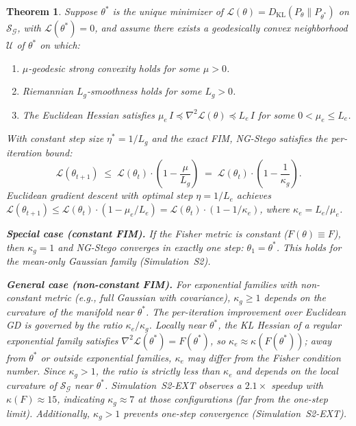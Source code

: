 \documentclass[a4paper,fleqn]{cas-dc}
\newtheorem{theorem}{Theorem}
\newcommand{\calS}{\mathcal{S}}
\newcommand{\calG}{\mathcal{G}}
\newcommand{\DKL}{D_{\mathrm{KL}}}
\begin{document}
\begin{theorem}%
  \label{thm:ng_convergence}
  Suppose $\theta^*$ is the unique minimizer of
  $\mathcal{L}(\theta)=\DKL(P_\theta\|P_{\theta^*})$ on $\calS_{\calG}$,
  with $\mathcal{L}(\theta^*)=0$, and assume there exists a geodesically
  convex neighborhood $\mathcal{U}$ of $\theta^*$ on which:
  \begin{enumerate}
    \item[(i)] \emph{$\mu$-geodesic strong convexity} holds
          for some $\mu>0$.
    \item[(ii)] \emph{Riemannian $L_g$-smoothness} holds for some $L_g>0$.
    \item[(iii)] The Euclidean Hessian satisfies
          $\mu_e\,I \preceq \nabla^2\mathcal{L}(\theta) \preceq L_e\,I$
          for some $0<\mu_e\leq L_e$.
  \end{enumerate}
  With constant step size $\eta^* = 1/L_g$ and the exact FIM, NG-Stego
  satisfies the per-iteration bound:
  \begin{equation}
    \mathcal{L}(\theta_{t+1})
    \;\leq\; \mathcal{L}(\theta_t)\cdot\left(1 - \frac{\mu}{L_g}\right)
    \;=\; \mathcal{L}(\theta_t)\cdot\left(1 - \frac{1}{\kappa_g}\right).
    \label{eq:ng_rate}
  \end{equation}
  Euclidean gradient descent with optimal step $\eta = 1/L_e$ achieves
  $\mathcal{L}(\theta_{t+1}) \leq \mathcal{L}(\theta_t)\cdot(1 - \mu_e/L_e)
  = \mathcal{L}(\theta_t)\cdot(1 - 1/\kappa_e)$, where
  $\kappa_e = L_e/\mu_e$.

  \textbf{Special case (constant FIM).}
  If the Fisher metric is constant ($F(\theta) \equiv F$), then
  $\kappa_g = 1$ and NG-Stego converges in \emph{exactly one step}:
  $\theta_1 = \theta^*$.
  This holds for the mean-only Gaussian family
  (Simulation~S2).

  \textbf{General case (non-constant FIM).}
  For exponential families with non-constant metric (e.g., full Gaussian
  with covariance), $\kappa_g \geq 1$ depends on the curvature of the
  manifold near $\theta^*$.  The per-iteration improvement over
  Euclidean GD is governed by the ratio $\kappa_e / \kappa_g$.
  Locally near $\theta^*$, the KL Hessian of a regular exponential family
  satisfies $\nabla^2\mathcal{L}(\theta^*) = F(\theta^*)$, so
  $\kappa_e \approx \kappa(F(\theta^*))$; away from $\theta^*$ or outside
  exponential families, $\kappa_e$ may differ from the Fisher condition
  number.  Since $\kappa_g > 1$, the ratio is strictly less than
  $\kappa_e$ and depends on the local curvature of $\calS_{\calG}$ near
  $\theta^*$.
  Simulation~S2-EXT observes a $2.1\times$ speedup with
  $\kappa(F)\approx 15$, indicating $\kappa_g \approx 7$ at those
  configurations (far from the one-step limit).
  Additionally, $\kappa_g > 1$ prevents one-step convergence
  (Simulation~S2-EXT).


\end{theorem}
\end{document}
